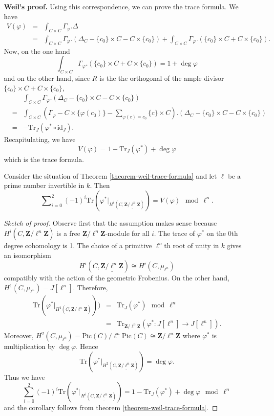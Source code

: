\medskip\noindent
{\bf Weil's proof.} Using this correspondence, we can prove the trace
formula. We have
\begin{eqnarray*}
V(\varphi) & = & \int_{C\times C} \Gamma_\varphi.\Delta \\
& = & \int_{C\times C} \Gamma_\varphi. \left(\Delta_C - \{c_0\} \times C - C
\times \{c_0\}\right) + \int_{C\times C} \Gamma_\varphi. \left(\{c_0\} \times C
+ C \times \{c_0\}\right).
\end{eqnarray*}
Now, on the one hand
$$
\int_{C\times C} \Gamma_\varphi. \left(\{c_0\} \times C + C \times
\{c_0\}\right)
=
1 + \deg \varphi
$$
and on the other hand, since $R$ is the the orthogonal of the ample divisor
$\{c_0\} \times C + C \times \{c_0\}$,
\begin{eqnarray*}
&&
\int_{C\times C} \Gamma_\varphi. \left(\Delta_C - \{c_0\} \times C - C \times
\{c_0\}\right) \\
& = &
\int_{C\times C} \left(\Gamma_\varphi - C \times \{\varphi(c_0)\} -
\sum_{\varphi(c) = c_0} \{c\} \times C \right). \left(\Delta_C - \{c_0\} \times
C - C \times \{c_0\}\right) \\
& = & - \text{Tr}_J (\varphi^* \circ \text{id}_J).
\end{eqnarray*}
Recapitulating, we have
$$
V(\varphi) = 1 - \text{Tr}_J (\varphi^*) + \deg \varphi
$$
which is the trace formula.

\begin{lemma}
\label{lemma-weil-mod}
Consider the situation of
Theorem \ref{theorem-weil-trace-formula}
and let $\ell$ be a prime number invertible in $k$. Then
$$
\sum\nolimits_{i=0}^2
(-1)^i
\text{Tr}(\varphi^* |_{H^i (C, \underline{\mathbf{Z}/\ell^n \mathbf{Z}})})
=
V(\varphi) \mod \ell^n.
$$
\end{lemma}

\begin{proof}[Sketch of proof]
Observe first that the assumption makes sense because $H^i(C,
\underline{\mathbf{Z}/\ell^n \mathbf{Z}})$ is a free $\mathbf{Z}/\ell^n
\mathbf{Z}$-module for all $i$. The trace of $\varphi^*$ on the 0th degree
cohomology is 1. The choice of a primitive $\ell^n$th root of unity in $k$
gives an isomorphism
$$
H^i(C,\underline{\mathbf{Z}/\ell^n \mathbf{Z}}) \cong H^i(C,\mu_{\ell^n})
$$
compatibly with the action of the geometric Frobenius. On the other hand,
$H^1(C,\mu_{\ell^n}) = J[\ell^n]$. Therefore,
\begin{eqnarray*}
\text{Tr}(\varphi^* |_{H^1 (C, \underline{\mathbf{Z}/\ell^n \mathbf{Z}})})) & =
& \text{Tr}_J (\varphi^*) \mod \ell^n \\
& = & \text{Tr}_{\mathbf{Z}/\ell^n \mathbf{Z}} (\varphi^* : J[\ell^n] \to
J[\ell^n]).
\end{eqnarray*}
Moreover, $H^2(C,\mu_{\ell^n}) = \text{Pic}(C)/\ell^n\text{Pic}(C) \cong
\mathbf{Z}/\ell^n \mathbf{Z}$ where $\varphi^*$ is multiplication by $\deg
\varphi$. Hence
$$
\text{Tr} (\varphi^*|_{H^2 (C, \underline{\mathbf{Z}/\ell^n \mathbf{Z}})}) =
\deg \varphi.
$$
Thus we have
$$
\sum_{i=0}^2 (-1)^i \text{Tr}(\varphi^* |_{H^i (C, \underline{\mathbf{Z}/\ell^n
\mathbf{Z}})}) = 1 - \text{Tr}_J(\varphi^*) + \deg \varphi \mod \ell^n
$$
and the corollary follows from theorem \ref{theorem-weil-trace-formula}.
\end{proof}

